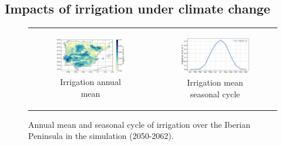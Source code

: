 \clearpage

\subsection{Impacts of irrigation under climate change}

\begin{figure}[htbp]
    \centering
    \begin{tabular}{cc}
        \begin{subfigure}[b]{0.48\textwidth}
            \caption{Irrigation annual mean}
            \includegraphics[width=\textwidth]{images/chap4/future/map_irrigation_fut.png}
        \end{subfigure} &
        \begin{subfigure}[b]{0.46\textwidth}
            \caption{Irrigation mean seasonal cycle}
            \includegraphics[width=\textwidth]{images/chap4/future/SC_irrigation_fut.png}
        \end{subfigure}
    \end{tabular}
    \caption{Annual mean and seasonal cycle of irrigation over the Iberian Peninsula in the \futirr simulation (2050-2062).}
    \label{fig:future_irrig}
\end{figure}


